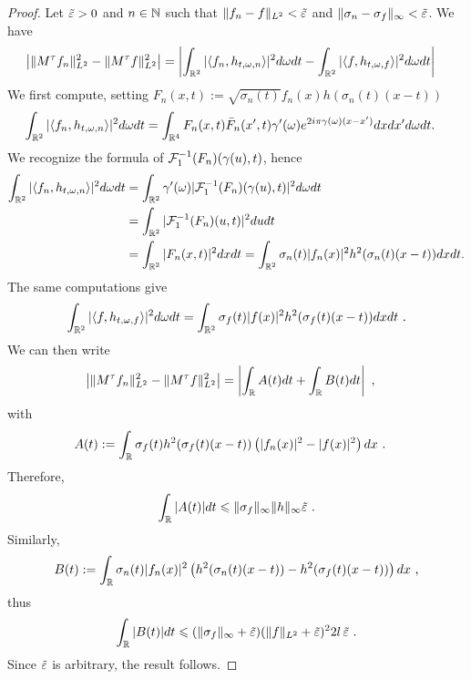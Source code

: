 \begin{proof}
    Let $\tilde{\varepsilon}>0$ and $n\in\mathbb{N}$ such that $\|f_n-f\|_{L^2}<\tilde{\varepsilon}$ and $\|\sigma_n-\sigma_f\|_\infty<\tilde{\varepsilon}$. We have
    \begin{align*}
        \left| \|M^\tau f_n \|^2_{L^2} - \|M^\tau f\|^2_{L^2} \right| & = \left| \int_{\mathbb{R}^2} |\langle f_n , h_{t,\omega,n}\rangle|^2 d\omega dt - \int_{\mathbb{R}^2} |\langle f , h_{t,\omega,f}\rangle|^2 d\omega dt \right|
    \end{align*}
    We first compute, setting $F_n(x,t):=\sqrt{\sigma_n(t)}f_n(x)h(\sigma_n(t)(x-t))$
    \begin{align*}
       \int_{\mathbb{R}^2} |\langle f_n , h_{t,\omega,n}\rangle|^2 d\omega dt &= 
       \int_{\mathbb{R}^4}F_n(x,t)\bar{F}_n(x',t)\gamma'(\omega)e^{2i\pi\gamma(\omega)(x-x')}dxdx'd\omega dt.
    \end{align*}
    We recognize the formula of $\mathcal{F}^{-1}_1(F_n)(\gamma(u),t)$, hence
    \begin{align*}
        \int_{\mathbb{R}^2} |\langle f_n , h_{t,\omega,n}\rangle|^2 d\omega dt 
        &= \int_{\mathbb{R}^2}\gamma'(\omega)|\mathcal{F}^{-1}_1(F_n)(\gamma(u),t)|^2 d\omega dt \\
        &= \int_{\mathbb{R}^2} |\mathcal{F}^{-1}_1(F_n)(u,t)|^2 dudt \\
       &= \int_{\mathbb{R}^2} |F_n(x,t)|^2 dxdt = \int_{\mathbb{R}^2}\sigma_n(t)|f_n(x)|^2 h^2(\sigma_n(t)(x-t)) dxdt.
    \end{align*}
    The same computations give 
    \begin{equation*}
        \int_{\mathbb{R}^2} |\langle f , h_{t,\omega,f}\rangle|^2 d\omega dt = \int_{\mathbb{R}^2} \sigma_f(t)|f(x)|^2 h^2(\sigma_f(t)(x-t)) dx dt\ .
    \end{equation*}
    We can then write
    \begin{align*}
           \left| \|M^\tau f_n \|^2_{L^2} - \|M^\tau f\|^2_{L^2} \right|  & = \left| \int_{\mathbb{R}} A(t)dt + \int_{\mathbb{R}} B(t)dt \right|\ ,
    \end{align*}
    with
    \begin{align*}
        A(t) &:= \int_{\mathbb{R}} \sigma_f(t)h^2(\sigma_f(t)(x-t))\left(|f_n(x)|^2-|f(x)|^2\right) dx\ .
    \end{align*}
    Therefore,
    \begin{equation*}
        \int_\R |A(t)|dt \leqslant \|\sigma_f\|_\infty \|h\|_{\infty}\tilde{\eps}\ .
    \end{equation*}
    Similarly,
    \begin{equation*}
    B(t):= \int_\R \sigma_n(t)|f_n(x)|^2\left(h^2(\sigma_n(t)(x-t))-h^2(\sigma_f(t)(x-t))\right)dx\ ,
    \end{equation*}
    thus
    \begin{equation*}
        \int_{\mathbb{R}} |B(t)|dt \leqslant (\|\sigma_f\|_\infty+\tilde{\varepsilon})(\|f\|_{L^2}+\tilde{\varepsilon})^2 2l\,\tilde{\varepsilon}\ .
    \end{equation*}
    Since $\tilde{\varepsilon}$ is arbitrary, the result follows.
\end{proof}

